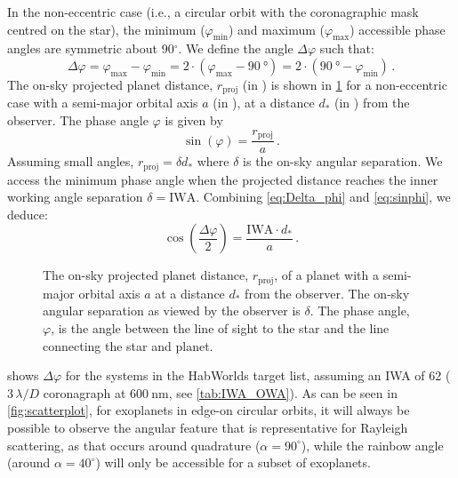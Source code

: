 \documentclass[
    usenatbib,
]{mnras}
\newcommand{\hwo}{HabWorlds}
\begin{document}
In the non-eccentric case (i.e., a circular orbit with the coronagraphic mask centred on the star), the minimum ($\varphi_\mathrm{min}$) and maximum ($\varphi_\mathrm{max}$) accessible phase angles are symmetric about 90$^\circ$. 
%
We define the angle $\Delta \varphi$ such that: 
\begin{equation}
 \label{eq:Delta_phi}
    \Delta \varphi 
    = \varphi_\mathrm{max} - \varphi_\mathrm{min}
    =  2 \cdot (\varphi_\mathrm{max} - \qty{90}{\degree}) 
    =  2 \cdot (\qty{90}{\degree} - \varphi_\mathrm{min} )  \,.
\end{equation} 
The on-sky projected planet distance, $r_\mathrm{proj}$ (in \unit{\au}) is shown in \cref{fig:scattering-angle} for a non-eccentric case with a 
semi-major orbital axis $a$ (in \unit{\au}), at a distance $d_*$ (in \unit{\parsec}) from the observer. 
%
The phase angle $\varphi$ is given by
\begin{equation}
    \sin(\varphi) = \frac{r_\mathrm{proj}}{a} \,.
    \label{eq:sinphi}
\end{equation}
%
Assuming small angles, $r_\mathrm{proj} = \delta d_*$ where $\delta$ is the on-sky angular separation.
%
We access the minimum phase angle when the projected distance reaches the inner working angle separation $\delta = \mathrm{IWA}$. 
%
Combining \cref{eq:Delta_phi} and \cref{eq:sinphi}, we deduce:
%
\begin{equation}
    \label{eq:scattering_angle}
    \cos\left(\dfrac{\Delta \varphi}{2}\right) = \frac{\mathrm{IWA} 
    \cdot d_*}{a} \,.
\end{equation}

\begin{figure}
    \centering
    
    \caption{
        The on-sky projected planet distance, $r_\mathrm{proj}$, of a planet with a semi-major orbital axis $a$ at a distance $d_*$ from the observer.
        The on-sky angular separation as viewed by the observer is $\delta$.
        The phase angle, $\varphi$, is the angle between the line of sight to the star and the line connecting the star and planet.  
    }
    \label{fig:scattering-angle}
\end{figure}

 shows $\Delta \varphi$ for the systems in the \hwo{} target list, assuming an IWA of \qty{62}{\mas} ($3\,\lambda / D$ coronagraph at $\qty{600}{\nano\meter}$, see \cref{tab:IWA_OWA}). 
%
%
As can be seen in \cref{fig:scatterplot}, for exoplanets in edge-on circular orbits, it will always be possible to observe the angular feature that is representative for Rayleigh scattering, as that occurs around quadrature ($\alpha=90^\circ$), while the rainbow angle (around $\alpha=40^\circ$) will only be accessible for a subset of exoplanets.
\end{document}
